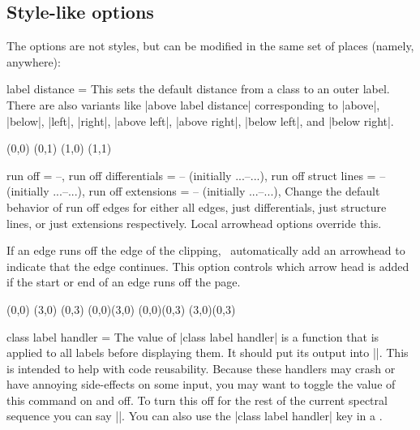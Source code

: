 \begin{sseqdata}[name = basic, cohomological Serre grading]
\subsection{Style-like options}
The options are not styles, but can be modified in the same set of places
(namely, anywhere):

\begin{keylist}{label distance = }%
This sets the default distance from a class to an outer label. There are also
variants like |above label distance| corresponding to |above|, |below|, |left|,
|right|, |above left|, |above right|, |below left|, and |below right|.
\begin{codeexample}[width = 6cm]
\begin{sseqpage}[ label distance = 0.3em,
                  right label distance = 0em,
                  no axes, yscale = 1.25 ]
\class["a" above](0,0)
(0,1)
\class["c" right](1,0)
\class["c" {right = 1em}](1,1)
\end{sseqpage}
\end{codeexample}
\end{keylist}

\begin{keylist}{run off = --,
    run off differentials = -- (initially {...--...}),
    run off struct lines = --  (initially {...--...}),
    run off extensions = -- (initially {...--...}),}%
Change the default behavior of run off edges for either all edges, just
differentials, just structure lines, or just extensions respectively. Local
arrowhead options override this.

If an edge runs off the edge of the clipping, \sseqpages\ automatically add an
arrowhead to indicate that the edge continues. This option controls which arrow
head is added if the start or end of an edge runs off the page.
\begin{codeexample}[width = 6cm]
\begin{sseqpage}[ x range = {0}{2}, y range = {0}{2},
                  draw orphan edges, run off = >-stealth ]
\class(0,0)
\class(3,0) \class(0,3)
\structline(0,0)(3,0)
\structline[red](0,0)(0,3)
\structline[blue](3,0)(0,3)
\end{sseqpage}
\end{codeexample}
\end{keylist}

\begin{key}{class label handler = }
%
The value of |class label handler| is a function that is applied to all labels
before displaying them. It should put its output into |\result|. This is
intended to help with code reusability. Because these handlers may crash or have
annoying side-effects on some input, you may want to toggle the value of this
command on and off. To turn this off for the rest of the current spectral
sequence you can say ||. You can also use the
|class label handler| key in a \scopeenv.


\end{key}
\end{sseqdata}
